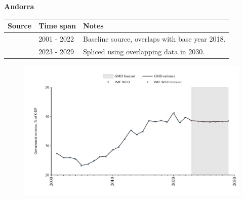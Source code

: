 \documentclass[12pt,a4paper,landscape]{article}
\begin{document}
\begin{adjustbox}{max totalsize={\paperwidth}{\paperheight},center}
\begin{minipage}[t][\textheight][t]{\textwidth}
\vspace*{0.5cm}
{}
\begin{center}
{\Large\bfseries Andorra}
\end{center}
\vspace{0.5cm}
\begin{table}[H]
\centering
\small
\begin{tabular}{|l|l|l|}
\hline
\textbf{Source} & \textbf{Time span} & \textbf{Notes} \\
\hline
\rowcolor{white}\cite{IMF_WEO}& 2001 - 2022 &Baseline source, overlaps with base year 2018.\\
\rowcolor{lightgray}\cite{IMF_WEO_forecast}& 2023 - 2029 &Spliced using overlapping data in 2030.\\
\hline
\end{tabular}
\end{table}
\begin{figure}[H]
\centering
\includegraphics[width=\textwidth,height=0.6\textheight,keepaspectratio]{graphs/AND_govrev_GDP.pdf}
\end{figure}
\end{minipage}
\end{adjustbox}
\end{document}
